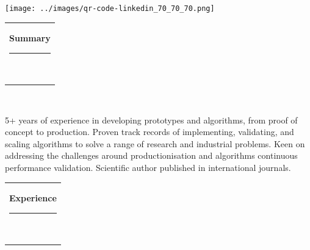 \documentclass[10pt,A4,english]{article}
\newcommand{\mpwidth}{\linewidth-\fboxsep-\fboxsep}
\newcommand{\cvtext}[1] {
	\begin{tabular*}{1\mpwidth}{p{0.98\mpwidth}}
		\parbox{1\mpwidth}{#1}
	\end{tabular*}
}
\newlength{\barw}
\newcommand{\cvsection}[1] {
	\vspace{14pt}
	\cvtext{
		\textbf{\LARGE{\textcolor{darkcol}{#1}}}\\[-4pt]
		\textcolor{accentcol}{ \rule{\barw}{1.5pt} } \\[-5pt]
	}
}
\newcommand{\cvqrcode}[1] {
	\begin{center}
		\texttt{[image: qrcode]}
	\end{center}
}
\begin{document}
\begin{paracol}{2}
\begin{leftcolumn}
\vspace*{0.6cm}
\begin{center}
	\hspace*{-0.8cm}
	\texttt{[image: ../images/qr-code-linkedin\_70\_70\_70.png]}	
\end{center}


	

\end{leftcolumn}
\begin{rightcolumn}


\cvsection{Summary}
~

5+ years of experience in developing prototypes and algorithms, from proof of concept to production. Proven track records of implementing, validating, and scaling algorithms to solve a range of research and industrial problems. Keen on addressing the challenges around productionisation and algorithms continuous performance validation.  Scientific author published in international journals.


\cvsection{Experience}




\end{rightcolumn}
\end{paracol}
\end{document}
